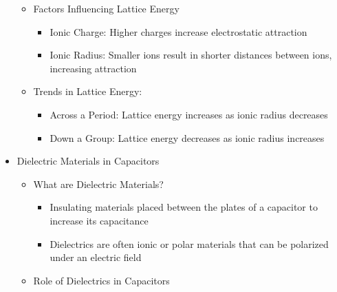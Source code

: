 \begin{itemize}
\begin{itemize}
\begin{itemize}
        \end{itemize}

      \item Factors Influencing Lattice Energy

        \begin{itemize}

          \item Ionic Charge: Higher charges increase electrostatic attraction

          \item Ionic Radius: Smaller ions result in shorter distances between ions, increasing attraction

        \end{itemize}

      \item Trends in Lattice Energy:

        \begin{itemize}

          \item Across a Period: Lattice energy increases as ionic radius decreases

          \item Down a Group: Lattice energy decreases as ionic radius increases

        \end{itemize}

    \end{itemize}

  \item Dielectric Materials in Capacitors

    \begin{itemize}

      \item What are Dielectric Materials?

        \begin{itemize}

          \item Insulating materials placed between the plates of a capacitor to increase its capacitance

          \item Dielectrics are often ionic or polar materials that can be polarized under an electric field

        \end{itemize}

      \item Role of Dielectrics in Capacitors


\end{itemize}
\end{itemize}
